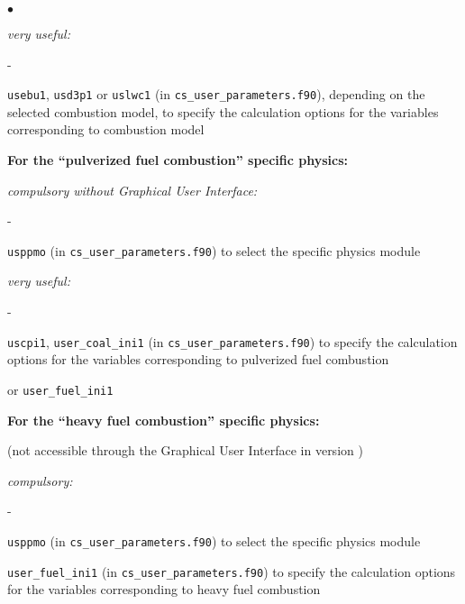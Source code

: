 {{{\begin{list}{$\bullet$}{}
\begin{list}{}{}
\begin{list}{}{}
        \item {\em very useful:}
        \begin{list}{-}{}
            \item  \texttt{usebu1}, \texttt{usd3p1} or \texttt{uslwc1}
                   (in \texttt{cs\_user\_parameters.f90}),
                   depending on the selected combustion model,
                   to specify the calculation options
                   for the variables
                   corresponding to combustion model
        \end{list}
    \end{list}

  \item{\bf For the ``pulverized fuel combustion'' specific physics:}

    \begin{list}{}{}
        \item {\em compulsory without Graphical User Interface:}
        \begin{list}{-}{}
            \item \texttt{usppmo} (in \texttt{cs\_user\_parameters.f90})
               to select the specific physics module
        \end{list}

        \item {\em very useful:}
        \begin{list}{-}{}
            \item  \texttt{uscpi1}, \texttt{user\_coal\_ini1}
               (in \texttt{cs\_user\_parameters.f90})
               to specify the calculation options
                   for the variables
                   corresponding to pulverized fuel combustion
        \end{list}
    \end{list}

or \texttt{user\_fuel\_ini1}
  \item{\bf For the ``heavy fuel combustion'' specific physics:}

 (not accessible through the Graphical User Interface in version \verscs)
    \begin{list}{}{}
        \item {\em compulsory:}
        \begin{list}{-}{}
            \item \texttt{usppmo} (in \texttt{cs\_user\_parameters.f90})
               to select the specific physics module
            \item \texttt{user\_fuel\_ini1}
               (in \texttt{cs\_user\_parameters.f90})
               to specify the calculation options
                   for the variables
                   corresponding to heavy fuel combustion
        \end{list}
    \end{list}



\end{list}
\end{list}}}}
